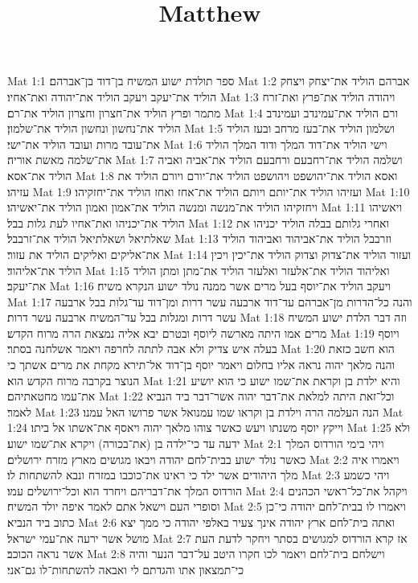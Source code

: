 

\title{Matthew}

Mat 1:1  ספר תולדת ישוע המשיח בן־דוד בן־אברהם׃
Mat 1:2  אברהם הוליד את־יצחק ויצחק הוליד את־יעקב ויעקב הוליד את־יהודה ואת־אחיו׃
Mat 1:3  ויהודה הוליד את־פרץ ואת־זרח מתמר ופרץ הוליד את־חצרון וחצרון הוליד את־רם׃
Mat 1:4  ורם הוליד את־עמינדב ועמינדב הוליד את־נחשון ונחשון הוליד את־שלמון׃
Mat 1:5  ושלמון הוליד את־בעז מרחב ובעז הוליד את־עובד מרות ועובד הוליד את־ישי׃
Mat 1:6  וישי הוליד את־דוד המלך ודוד המלך הוליד את־שלמה מאשת אוריה׃
Mat 1:7  ושלמה הוליד את־רחבעם ורחבעם הוליד את־אביה ואביה הוליד את־אסא׃
Mat 1:8  ואסא הוליד את־יהושפט ויהושפט הוליד את־יורם ויורם הוליד את עזיהו׃
Mat 1:9  ועזיהו הוליד את־יותם ויותם הוליד את־אחז ואחז הוליד את־יחזקיהו׃
Mat 1:10  ויחזקיהו הוליד את־מנשה ומנשה הוליד את־אמון ואמון הוליד את־יאשיהו׃
Mat 1:11  ויאשיהו הוליד את־יכניהו ואת־אחיו לעת גלות בבל׃
Mat 1:12  ואחרי גלותם בבלה הוליד יכניהו את שאלתיאל ושאלתיאל הוליד את־זרבבל׃
Mat 1:13  וזרבבל הוליד את־אביהוד ואביהוד הוליד את־אליקים ואליקים הוליד את עזור׃
Mat 1:14  ועזור הוליד את־צדוק וצדוק הוליד את־יכין ויכין הוליד את־אליהוד׃
Mat 1:15  ואליהוד הוליד את־אלעזר ואלעזר הוליד את־מתן ומתן הוליד את־יעקב׃
Mat 1:16  ויעקב הוליד את־יוסף בעל מרים אשר ממנה נולד ישוע הנקרא משיח׃
Mat 1:17  והנה כל־הדרות מן־אברהם עד־דוד ארבעה עשר דרות ומן־דוד עד־גלות בבל ארבעה עשר דרות ומגלות בבל עד־המשיח ארבעה עשר דרות׃
Mat 1:18  וזה דבר הלדת ישוע המשיח מרים אמו היתה מארשה ליוסף ובטרם יבא אליה נמצאת הרה מרוח הקדש׃
Mat 1:19  ויוסף בעלה איש צדיק ולא אבה לתתה לחרפה ויאמר אשלחנה בסתר׃
Mat 1:20  הוא חשב כזאת והנה מלאך יהוה נראה אליו בחלום ויאמר יוסף בן־דוד אל־תירא מקחת את מרים אשתך כי הנוצר בקרבה מרוח הקדש הוא׃
Mat 1:21  והיא ילדת בן וקראת את־שמו ישוע כי הוא יושיע את־עמו מחטאתיהם׃
Mat 1:22  וכל־זאת היתה למלאת את־דבר יהוה אשר־דבר ביד הנביא לאמר׃
Mat 1:23  הנה העלמה הרה וילדת בן וקראו שמו עמנואל אשר פרושו האל עמנו׃
Mat 1:24  וייקץ יוסף משנתו ויעש כאשר צוהו מלאך יהוה ויאסף את־אשתו אל ביתו׃
Mat 1:25  ולא ידעה עד כי־ילדה בן (את־בכורה) ויקרא את־שמו ישוע׃
Mat 2:1  ויהי בימי הורדוס המלך כאשר נולד ישוע בבית־לחם יהודה ויבאו מגושים מארץ מזרח ירושלים׃
Mat 2:2  ויאמרו איה מלך היהודים אשר ילד כי ראינו את־כוכבו במזרח ונבא להשתחות לו׃
Mat 2:3  ויהי כשמע הורדוס המלך את־דבריהם ויחרד הוא וכל־ירושלים עמו׃
Mat 2:4  ויקהל את־כל־ראשי הכהנים וסופרי העם וישאל אתם לאמר איפה יולד המשיח׃
Mat 2:5  ויאמרו לו בבית־לחם יהודה כי־כן כתוב ביד הנביא׃
Mat 2:6  ואתה בית־לחם ארץ יהודה אינך צעיר באלפי יהודה כי ממך יצא מושל אשר ירעה את־עמי ישראל׃
Mat 2:7  אז קרא הורדוס למגושים בסתר ויחקר לדעת העת אשר נראה הכוכב׃
Mat 2:8  וישלחם בית־לחם ויאמר לכו חקרו היטב על־דבר הנער והיה כי־תמצאון אתו והגדתם לי ואבאה להשתחות־לו גם־אני׃
